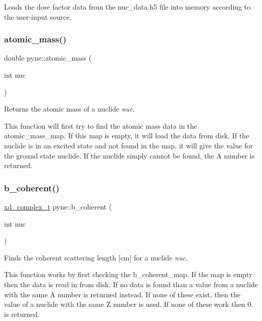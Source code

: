 Loads the dose factor data from the nuc\+\_\+data.\+h5 file into memory according to the user-\/input source. \mbox{\label{namespacepyne_aaab79c2417fc60c1a248dd702403befb}} 
\subsubsection{\texorpdfstring{atomic\+\_\+mass()}{atomic\_mass()}}
{\footnotesize\ttfamily double pyne\+::atomic\+\_\+mass (\begin{DoxyParamCaption}\item[{int}]{nuc }\end{DoxyParamCaption})}



Returns the atomic mass of a nuclide {\itshape nuc}. 

This function will first try to find the atomic mass data in the atomic\+\_\+mass\+\_\+map. If this map is empty, it will load the data from disk. If the nuclide is in an excited state and not found in the map, it will give the value for the ground state nuclide. If the nuclide simply cannot be found, the A number is returned. \mbox{\label{namespacepyne_a94620ef1a92c4562e8d4d54242428ab8}} 
\subsubsection{\texorpdfstring{b\+\_\+coherent()}{b\_coherent()}}
{\footnotesize\ttfamily \hyperlink{structxd__complex__t}{xd\+\_\+complex\+\_\+t} pyne\+::b\+\_\+coherent (\begin{DoxyParamCaption}\item[{int}]{nuc }\end{DoxyParamCaption})}



Finds the coherent scattering length \mbox{[}cm\mbox{]} for a nuclide {\itshape nuc}. 

This function works by first checking the b\+\_\+coherent\+\_\+map. If the map is empty then the data is read in from disk. If no data is found than a value from a nuclide with the same A number is returned instead. If none of these exist, then the value of a nuclide with the same Z number is used. If none of these work then 0. is returned. \mbox{\label{namespacepyne_a2f07313175b4a12453fcd84aca062f06}} 
